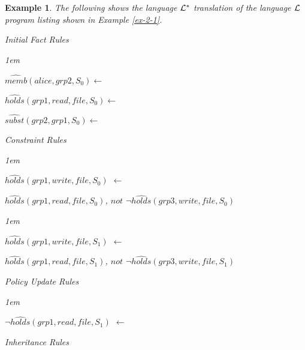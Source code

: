 \documentclass[11pt]{report}
\newtheorem{vexample}{Example}[chapter]
\newenvironment{vquote}
{
  \begin{list}{}{\leftmargin 1em}\item[]
}
{
  \end{list}
}
\begin{document}
          \begin{vexample}
            \label{ex-2-2}
            The following shows the language ${\cal L^{*}}$ translation of the
            language ${\cal L}$ program listing shown in Example \ref{ex-2-1}.

            \begin{enumerate}
              \item
                Initial Fact Rules
    
                \begin{vquote}
                  $\hat{memb}(alice, grp2, S_{0}) \leftarrow$
    
                  $\hat{holds}(grp1, read, file,S_{0}) \leftarrow$
    
                  $\hat{subst}(grp2, grp1, S_{0}) \leftarrow$
                \end{vquote}
    
              \item
                Constraint Rules
    
                \begin{vquote}
                  $\hat{holds}(grp1, write, file, S_{0})$ $\leftarrow$
    
                  \hspace{1em}
                  $\hat{holds}(grp1, read, file, S_{0})$,
                  $not$ $\lnot\hat{holds}(grp3, write, file, S_{0})$
                \end{vquote}
    
                \begin{vquote}
                  $\hat{holds}(grp1, write, file, S_{1})$ $\leftarrow$
    
                  \hspace{1em}
                  $\hat{holds}(grp1, read, file, S_{1})$,
                  $not$ $\lnot\hat{holds}(grp3, write, file, S_{1})$
                \end{vquote}
    
              \item
                Policy Update Rules
    
                \begin{vquote}
                  $\lnot\hat{holds}(grp1, read, file, S_{1})$ $\leftarrow$
                \end{vquote}
              \item
                Inheritance Rules
               

\end{enumerate}
\end{vexample}
\end{document}
